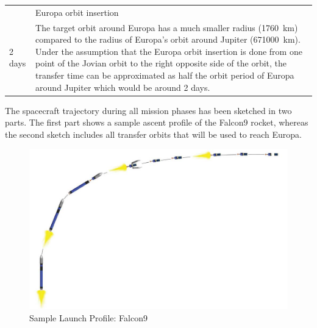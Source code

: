 \begin{longtable}{lp{}}
  & Europa orbit insertion \\

  2 days

  & The target orbit around Europa has a much smaller radius
  (\SI{1760}{km}) compared to the radius of Europa’s orbit around Jupiter
  (\SI{671000}{km}).  Under the assumption that the Europa orbit insertion
  is done from one point of the Jovian orbit to the right opposite
  side of the orbit, the transfer time can be approximated as half
  the orbit period of Europa around Jupiter which would be around 2
  days. \\ \bottomrule
\end{longtable}



The spacecraft trajectory during all mission phases has been sketched
in two parts. The first part shows a sample ascent profile of the
Falcon9 rocket, whereas the second sketch includes all transfer orbits
that will be used to reach Europa.

\begin{figure}[H]
  \includegraphics[width=\textwidth]{Launch-Profile}
  \caption{Sample Launch Profile: Falcon9 \cite{LVCFalcon9}}
\end{figure}

